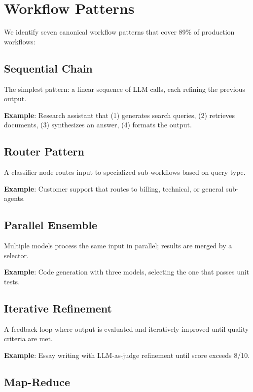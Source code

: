\section{Workflow Patterns}

\label{sec:patterns}

We identify seven canonical workflow patterns that cover 89\% of production workflows:

\subsection{Sequential Chain}

The simplest pattern: a linear sequence of LLM calls, each refining the previous output.

\textbf{Example}: Research assistant that (1) generates search queries, (2) retrieves documents, (3) synthesizes an answer, (4) formats the output.

\subsection{Router Pattern}

A classifier node routes input to specialized sub-workflows based on query type.

\textbf{Example}: Customer support that routes to billing, technical, or general sub-agents.

\subsection{Parallel Ensemble}

Multiple models process the same input in parallel; results are merged by a selector.

\textbf{Example}: Code generation with three models, selecting the one that passes unit tests.

\subsection{Iterative Refinement}

A feedback loop where output is evaluated and iteratively improved until quality criteria are met.

\textbf{Example}: Essay writing with LLM-as-judge refinement until score exceeds 8/10.

\subsection{Map-Reduce}


